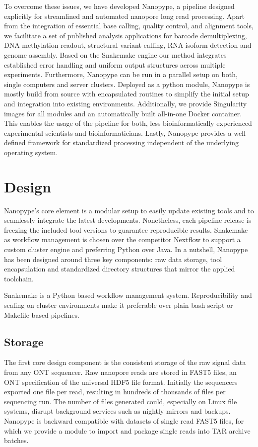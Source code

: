 To overcome these issues, we have developed Nanopype, a pipeline designed explicitly for streamlined and automated nanopore long read processing. Apart from the integration of essential base calling, quality control, and alignment tools, we facilitate a set of published analysis applications for barcode demultiplexing, DNA methylation readout, structural variant calling, RNA isoform detection and genome assembly. 
Based on the Snakemake engine \cite{Koester2012} our method integrates established error handling and uniform output structures across multiple experiments. Furthermore, Nanopype can be run in a parallel setup on both, single computers and server clusters. Deployed as a python module, Nanopype is mostly build from source with encapsulated routines to simplify the initial setup and integration into existing environments. Additionally, we provide Singularity images for all modules and an automatically built all-in-one Docker container. This enables the usage of the pipeline for both, less bioinformatically experienced experimental scientists and bioinformaticians. Lastly, Nanopype provides a well-defined framework for standardized processing independent of the underlying operating system.




\section{Design}
\label{sec:nanopype:design}
Nanopype’s core element is a modular setup to easily update existing tools and to seamlessly integrate the latest developments. Nonetheless, each pipeline release is freezing the included tool versions to guarantee reproducible results. Snakemake as workflow management is chosen over the competitor Nextflow to support a custom cluster engine and preferring Python over Java. In a nutshell, Nanopype has been designed around three key components: raw data storage, tool encapsulation and standardized directory structures that mirror the applied toolchain.

\begin{tcolorbox}[breakable,title=Snakemake]
	Snakemake is a Python based workflow management system. Reproducibility and scaling on cluster environments make it preferable over plain bash script or Makefile based pipelines. 
\end{tcolorbox}


\subsection{Storage}
\label{subsec:nanopype:storage}
The first core design component is the consistent storage of the raw signal data from any ONT sequencer. 
Raw nanopore reads are stored in FAST5 files, an ONT specification of the universal HDF5 file format. Initially the sequencers exported one file per read, resulting in hundreds of thousands of files per sequencing run. 
The number of files generated could, especially on Linux file systems, disrupt background services such as nightly mirrors and backups.
Nanopype is backward compatible with datasets of single read FAST5 files, for which we provide a module to import and package single reads into TAR archive batches.

